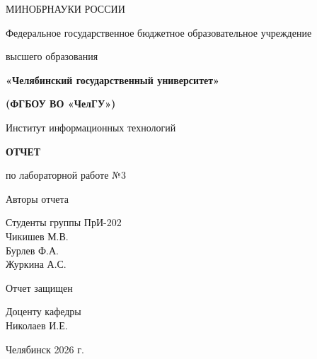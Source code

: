 \setmainfont{Liberation Serif}
\setsansfont{Liberation Sans}
\setmonofont{Liberation Mono}

\begin{titlepage}
\thispagestyle{empty}
\centering

{\small МИНОБРНАУКИ РОССИИ\par}
{\small Федеральное государственное бюджетное образовательное учреждение\par
высшего образования\par}
{\bfseries\small «Челябинский государственный университет»\par}
{\bfseries\small (ФГБОУ ВО «ЧелГУ»)\par}

\vspace{1.5em}
{\small Институт информационных технологий\par}

\vfill

{\Large\bfseries ОТЧЕТ\par}
\vspace{0.8em}
{\large по лабораторной работе №3\par}

\vfill

\begin{small}
\noindent
\begin{minipage}[t]{0.45\textwidth}
Авторы отчета
\end{minipage}%
\begin{minipage}[t]{0.5\textwidth}
Студенты группы ПрИ-202\\
Чикишев М.В.\\
Бурлев Ф.А.\\
Журкина А.С.
\end{minipage}

\vspace{4em}

\noindent
\begin{minipage}[t]{0.45\textwidth}
Отчет защищен
\end{minipage}%
\begin{minipage}[t]{0.5\textwidth}
Доценту кафедры\\
Николаев И.Е.
\end{minipage}
\end{small}

\vfill

{\small Челябинск 2026 г.\par}

\end{titlepage}
\newpage
\setcounter{page}{2}
